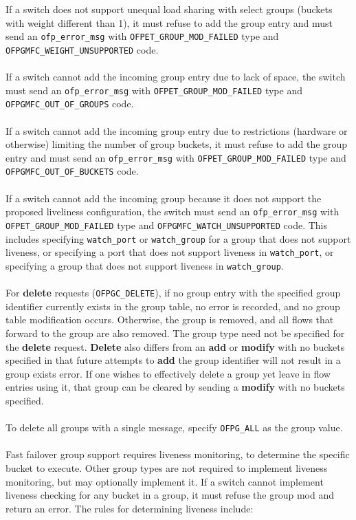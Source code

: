 \documentclass[10pt]{article}
\begin{document}
If a switch does not support unequal load sharing with select groups (buckets with weight different than 1), it must refuse to add the group entry and must send an \verb|ofp_error_msg| with \verb|OFPET_GROUP_MOD_FAILED| type and \verb|OFPGMFC_WEIGHT_UNSUPPORTED| code.
\\\\
If a switch cannot add the incoming group entry due to lack of space, the switch must send an \verb|ofp_error_msg| with \verb|OFPET_GROUP_MOD_FAILED| type and \verb|OFPGMFC_OUT_OF_GROUPS| code.
\\\\
If a switch cannot add the incoming group entry due to restrictions (hardware or otherwise) limiting the number of group buckets, it must refuse to add the group entry and must send an \verb|ofp_error_msg| with \verb|OFPET_GROUP_MOD_FAILED| type and \verb|OFPGMFC_OUT_OF_BUCKETS| code.
\\\\
If a switch cannot add the incoming group because it does not support the proposed liveliness configuration, the switch must send an \verb|ofp_error_msg| with \verb|OFPET_GROUP_MOD_FAILED| type and \verb|OFPGMFC_WATCH_UNSUPPORTED| code. This includes specifying \verb|watch_port| or \verb|watch_group| for a group that does not support liveness, or specifying a port that does not support liveness in \verb|watch_port|, or specifying a group that does not support liveness in \verb|watch_group|.
\\\\
For \textbf{delete} requests (\verb|OFPGC_DELETE|), if no group entry with the specified group identifier currently exists in the group table, no error is recorded, and no group table modification occurs.  Otherwise, the group is removed, and all flows that forward to the group are also removed. The group type need not be specified for the \textbf{delete} request. \textbf{Delete} also differs from an \textbf{add} or \textbf{modify} with no buckets specified in that future attempts to \textbf{add} the group identifier will not result in a group exists error.  If one wishes to effectively delete a group yet leave in flow entries using it, that group can be cleared by sending a \textbf{modify} with no buckets specified.
\\\\
To delete all groups with a single message, specify \verb|OFPG_ALL| as the group value.
\\\\
Fast failover group support requires liveness monitoring, to determine the specific bucket to execute. Other group types are not required to implement liveness monitoring, but may optionally implement it.  If a switch cannot implement liveness checking for any bucket in a group, it must refuse the group mod and return an error.  The rules for determining liveness include:
\end{document}
